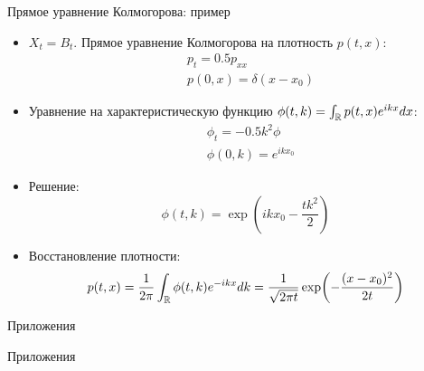 \documentclass[aspectratio=169]{beamer}
\begin{document}
\begin{frame}{Прямое уравнение Колмогорова: пример}
    \begin{itemize}
       \item $X_t = B_t$. Прямое уравнение Колмогорова на плотность $p(t, x)$:
        \begin{align*}
            &p_t = 0.5 p_{xx} \\
            &p(0, x) = \delta(x-x_0)
        \end{align*}

        \item Уравнение на характеристическую функцию $\phi(t, k) = \int_{\mathbb{R}} p(t, x) e^{ikx} dx$:
        \begin{align*}
            &\phi_t = -0.5 k^2 \phi \\
            &\phi(0, k) = e^{ikx_0}
        \end{align*}
        
        \item Решение: 
        $$
            \phi(t, k) = \exp(ikx_0-\dfrac{t k^2}{2})
        $$ 

        \item Восстановление плотности:
        $$
            p(t, x) = \dfrac{1}{2\pi} \int_{\mathbb{R}} \phi(t, k) e^{-ikx} dk = \dfrac{1}{\sqrt{2\pi t}} \exp(-\dfrac{(x-x_0)^2}{2t})
        $$
    \end{itemize}
\end{frame}

\begin{frame}{Приложения}

\begin{center}
\Large Приложения
\end{center}

\end{frame}
\end{document}
